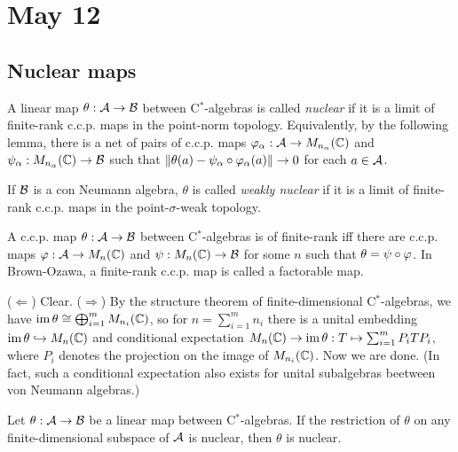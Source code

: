 \documentclass{../../small}
\begin{document}
\newpage
\section{May 12}

\subsection{Nuclear maps}

\begin{defn}
A linear map $\theta:\mathcal{A}\to\mathcal{B}$ between C$^*$-algebras is called \emph{nuclear} if it is a limit of finite-rank c.c.p. maps in the point-norm topology.
Equivalently, by the following lemma, there is a net of pairs of c.c.p. maps $\varphi_\alpha:\mathcal{A}\to M_{n_\alpha}(\mathbb{C})$ and $\psi_\alpha:M_{n_\alpha}(\mathbb{C})\to\mathcal{B}$ such that $\|\theta(a)-\psi_\alpha\circ\varphi_\alpha(a)\|\to0$ for each $a\in\mathcal{A}$.

If $\mathcal{B}$ is a con Neumann algebra, $\theta$ is called \emph{weakly nuclear} if it is a limit of finite-rank c.c.p. maps in the point-$\sigma$-weak topology.
\end{defn}

\begin{lem}
A c.c.p. map $\theta:\mathcal{A}\to\mathcal{B}$ between C$^*$-algebras is of finite-rank iff there are c.c.p. maps $\varphi:\mathcal{A}\to M_n(\mathbb{C})$ and $\psi:M_n(\mathbb{C})\to\mathcal{B}$ for some $n$ such that $\theta=\psi\circ\varphi$.
In Brown-Ozawa, a finite-rank c.c.p. map is called a factorable map.
\end{lem}
\begin{pf}
($\Leftarrow$) Clear.
($\Rightarrow$)
By the structure theorem of finite-dimensional C$^*$-algebras, we have $\operatorname{im}\theta\cong\bigoplus_{i=1}^mM_{n_i}(\mathbb{C})$,
so for $n=\sum_{i=1}^mn_i$ there is a unital embedding $\operatorname{im}\theta\hookrightarrow M_n(\mathbb{C})$ and conditional expectation $M_n(\mathbb{C})\to\operatorname{im}\theta:T\mapsto\sum_{i=1}^mP_iTP_i$, where $P_i$ denotes the projection on the image of $M_{n_i}(\mathbb{C})$.
Now we are done.
(In fact, such a conditional expectation also exists for unital subalgebras beetween von Neumann algebras.)
\end{pf}


\begin{prop}
Let $\theta:\mathcal{A}\to\mathcal{B}$ be a linear map between C$^*$-algebras.
If the restriction of $\theta$ on any finite-dimensional subspace of $\mathcal{A}$ is nuclear, then $\theta$ is nuclear.
\end{prop}
\begin{pf}

\end{pf}
\end{document}
